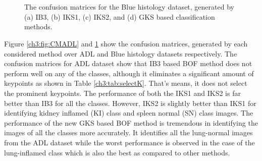 \begin{figure}[h]
\centering
{} ~~
\\
~~
\caption[The confusion matrices for the Blue histology dataset, generated by IB3, IKS1, IKS2, and GKS based classification methods]{\fontsize{10}{12}\selectfont The confusion matrices for the Blue histology dataset, generated by (a) IB3, (b) IKS1, (c) IKS2, and (d) GKS based classification methods.}
\label{ch3:fig:CMTissue}
\end{figure}
Figure \ref{ch3:fig:CMADL} and \ref{ch3:fig:CMTissue} show the confusion matrices, generated by each considered method over ADL and Blue histology datasets respectively. The confusion matrices for ADL dataset show that IB3 based BOF method does not perform well on any of the classes, although it eliminates a significant amount of keypoints as shown in Table \ref{ch3:tab:selectK}. That's means, it does not select the prominent keypoints. The performance of both the IKS1 and  IKS2 is far better than IB3 for all the classes. However, IKS2 is slightly better than IKS1 for identifying kidney inflamed (KI) class and spleen normal (SN) class images. The performance of the new GKS based BOF method is tremendous in identifying the images of all the classes more accurately. It identifies all the lung-normal images from the ADL dataset while the worst performance is observed in the case of the lung-inflamed class which is also the best as compared to other methods.
